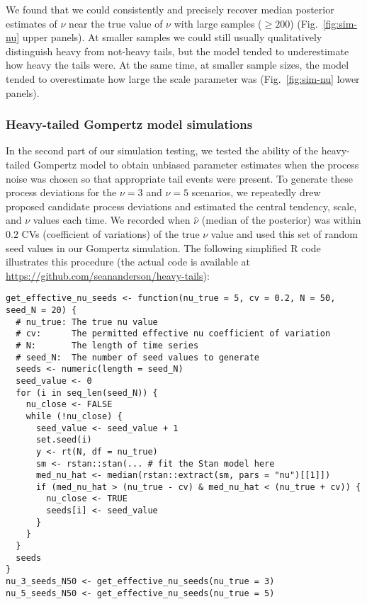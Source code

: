 We found that we could consistently and precisely recover median posterior
estimates of $\nu$ near the true value of $\nu$ with large samples ($\ge 200$)
(Fig.~\ref{fig:sim-nu} upper panels). At smaller samples we could still
usually qualitatively distinguish heavy from not-heavy tails, but the model
tended to underestimate how heavy the tails were. At the same time, at smaller
sample sizes, the model tended to overestimate how large the scale parameter
was (Fig.~\ref{fig:sim-nu} lower panels).

\subsubsection{Heavy-tailed Gompertz model simulations}

In the second part of our simulation testing, we tested the ability of the
heavy-tailed Gompertz model to obtain unbiased parameter estimates when the
process noise was chosen so that appropriate tail events were present. To
generate these process deviations for the $\nu = 3$ and $\nu = 5$ scenarios,
we repeatedly drew proposed candidate process deviations and estimated the
central tendency, scale, and $\nu$ values each time. We recorded when
$\hat{\nu}$ (median of the posterior) was within $0.2$ CVs (coefficient of
variations) of the true $\nu$ value and used this set of random seed values in
our Gompertz simulation. The following simplified R code illustrates this
procedure (the actual code is available at
\url{https://github.com/seananderson/heavy-tails}):

\begin{footnotesize}
\begin{verbatim}
get_effective_nu_seeds <- function(nu_true = 5, cv = 0.2, N = 50, seed_N = 20) {
  # nu_true: The true nu value
  # cv:      The permitted effective nu coefficient of variation
  # N:       The length of time series
  # seed_N:  The number of seed values to generate
  seeds <- numeric(length = seed_N)
  seed_value <- 0
  for (i in seq_len(seed_N)) {
    nu_close <- FALSE
    while (!nu_close) {
      seed_value <- seed_value + 1
      set.seed(i)
      y <- rt(N, df = nu_true)
      sm <- rstan::stan(... # fit the Stan model here
      med_nu_hat <- median(rstan::extract(sm, pars = "nu")[[1]])
      if (med_nu_hat > (nu_true - cv) & med_nu_hat < (nu_true + cv)) {
        nu_close <- TRUE
        seeds[i] <- seed_value
      }
    }
  }
  seeds
}
nu_3_seeds_N50 <- get_effective_nu_seeds(nu_true = 3)
nu_5_seeds_N50 <- get_effective_nu_seeds(nu_true = 5)
\end{verbatim}
\end{footnotesize}

